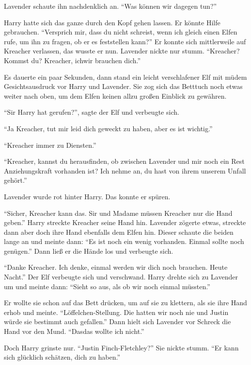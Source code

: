 \begin{abAchtzehn}
Lavender schaute ihn nachdenklich an. \enquote{Was können wir dagegen tun?}

Harry hatte sich das ganze durch den Kopf gehen lassen. Er könnte Hilfe gebrauchen. \enquote{Versprich mir, dass du nicht schreist, wenn ich gleich einen Elfen rufe, um ihn zu fragen, ob er es feststellen kann?} Er konnte sich mittlerweile auf Kreacher verlassen, das wusste er nun. Lavender nickte nur stumm. \enquote{Kreacher? Kommst du? Kreacher, ich\abs wir brauchen dich.}

Es dauerte ein paar Sekunden, dann stand ein leicht verschlafener Elf mit müdem Gesichtsausdruck vor Harry und Lavender. Sie zog sich das Betttuch noch etwas weiter nach oben, um dem Elfen keinen allzu großen Einblick zu gewähren.

\enquote{Sir Harry hat gerufen?}, sagte der Elf und verbeugte sich.

\enquote{Ja Kreacher, tut mir leid dich geweckt zu haben, aber es ist wichtig.}

\enquote{Kreacher immer zu Diensten.}

\enquote{Kreacher, kannst du herausfinden, ob zwischen Lavender und mir noch ein Rest Anziehungskraft vorhanden ist? Ich nehme an, du hast von ihrem \gst unserem Unfall gehört.}

Lavender wurde rot hinter Harry. Das konnte er spüren. 

\enquote{Sicher, Kreacher kann das. Sir und Madame müssen Kreacher nur die Hand geben.} Harry streckte Kreacher seine Hand hin. Lavender zögerte etwas, streckte dann aber doch ihre Hand ebenfalls dem Elfen hin. Dieser schaute die beiden lange an und meinte dann: \enquote{Es ist noch ein wenig vorhanden. Einmal sollte noch genügen.} Dann ließ er die Hände los und verbeugte sich.

\enquote{Danke Kreacher. Ich denke, einmal werden wir dich noch brauchen. Heute Nacht.} Der Elf verbeugte sich und verschwand. Harry drehte sich zu Lavender um und meinte dann: \enquote{Sieht so aus, als ob wir noch einmal müssten.}

Er wollte sie schon auf das Bett drücken, um auf sie zu klettern, als sie ihre Hand erhob und meinte. \enquote{Löffelchen-Stellung. Die hatten wir noch nie und Justin würde sie bestimmt auch gefallen.} Dann hielt sich Lavender vor Schreck die Hand vor den Mund. \enquote{Das\abs das wollte ich nicht.}

Doch Harry grinste nur. \enquote{Justin Finch-Fletchley?} Sie nickte stumm. \enquote{Er kann sich glücklich schätzen, dich zu haben.}


\end{abAchtzehn}
